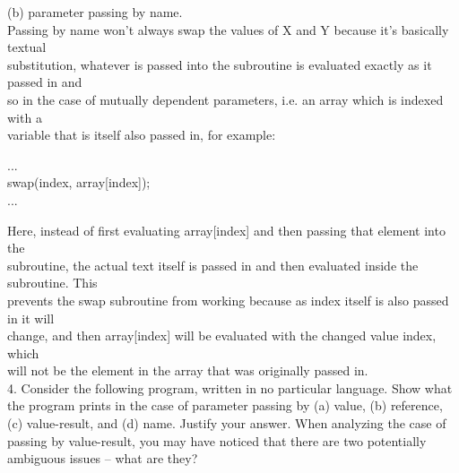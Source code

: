 \documentclass[12pt]{article}
\begin{document}
\begin{flushleft}
\qquad (b) parameter passing by name.\\
[2mm]

\qquad \qquad Passing by name won't always swap the values of X and Y because it's basically textual\\
\qquad \qquad substitution, whatever is passed into the subroutine is evaluated exactly as it passed in and\\
\qquad \qquad so in the case of mutually dependent parameters, i.e. an array  which is indexed with a\\
\qquad \qquad variable that is itself also passed in, for example:\\ 
[2mm]
{\selectfont
	
\qquad \qquad \qquad ...\\
\qquad \qquad \qquad swap(index, array[index]);\\
\qquad \qquad \qquad ...\\
[2mm]
}

\qquad \qquad Here, instead of first evaluating {\selectfont array[index]} and then passing that element into the\\
\qquad \qquad subroutine, the actual text itself is passed in and then evaluated inside the subroutine.  This\\
\qquad \qquad prevents the swap subroutine from working because as {\selectfont index} itself is also passed in it will\\
\qquad \qquad change, and then {\selectfont array[index]} will be evaluated with the changed value {\selectfont index}, which\\
\qquad \qquad will not be the element in the array that was originally passed in.\\
[4mm]

4. Consider the following program, written in no particular language. Show what the program prints in the case of parameter passing by (a) value, (b) reference, (c) value-result, and (d) name. Justify your answer. When analyzing the case of passing by value-result, you may have noticed that there are two potentially ambiguous issues – what are they?\\
[2mm]
{\selectfont

}
\end{flushleft}
\end{document}
